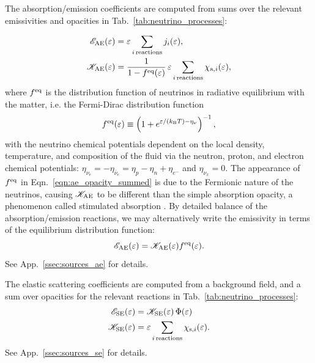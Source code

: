 \documentclass[aps,floatfix,prd,superscriptaddress,twocolumn]{revtex4-1}
\newcommand{\todo}[1]{\marginpar{\tiny{\textcolor{red}{#1}}}}
\renewcommand\todo[1]{} %
\begin{document}
The absorption/emission coefficients are computed from sums
over the relevant emissivities and opacities
in Tab.~\ref{tab:neutrino_processes}:
\todo{define $j$ and $\chi$}
\begin{align}
  \label{eqn:ae_emissivity_summed}
  \mathscr{E}_{\rm AE}(\varepsilon)
  &= \varepsilon \sum_{i\,{\rm reactions}} j_i(\varepsilon), \\
  \label{eqn:ae_opacity_summed}
  \mathscr{K}_{\rm AE}(\varepsilon)
  &= \frac{1}{1-f^{\rm eq}(\varepsilon)} \,
  \varepsilon \sum_{i\,{\rm reactions}} \chi_{{\rm a},i}(\varepsilon),
\end{align}
where $f^{\rm eq}$ is the distribution function of neutrinos in radiative
equilibrium with the matter, i.e. the Fermi-Dirac distribution function
\begin{equation}
  \label{eqn:feq}
  f^{\rm eq}(\varepsilon) \equiv
  \left(1+e^{\varepsilon/(k_{\rm B} T) -\eta_\nu}\right)^{-1},
\end{equation}
with the neutrino chemical potentials dependent on the local density,
temperature, and composition of the fluid via the neutron, proton,
and electron chemical potentials:
$\eta_{\nu_e}=-\eta_{\bar{\nu}_e}=\eta_p-\eta_n+\eta_{e^-}$ and
$\eta_{\nu_x}=0$.
The appearance of $f^{\rm eq}$ in Eqn.~\ref{eqn:ae_opacity_summed} is due to
the Fermionic nature of the neutrinos, causing $\mathscr{K}_{\rm AE}$ to be
different than the simple absorption opacity,
a phenomenon called stimulated absorption \cite{burr2006-neutrino_opacities}.
By detailed balance of the absorption/emission reactions, we may alternatively
write the emissivity in terms of the equilibrium distribution function:
\begin{equation}
  \label{eqn:ae_emissivity_feq}
  \mathscr{E}_{\rm AE}(\varepsilon)
  = \mathscr{K}_{\rm AE}(\varepsilon) f^{\rm eq}(\varepsilon).
\end{equation}
See App.~\ref{ssec:sources_ae} for details.
\todo{identify $\mathscr{K}_{\rm AE}$ and $\kappa^*$,
  in e.g.\ \cite{hari2010-gr_nunubar_collapsar}}

The elastic scattering coefficients are computed from
a background field, and a sum over opacities for
the relevant reactions in Tab.~\ref{tab:neutrino_processes}:
\begin{align}
  \label{eqn:se_emissivity}
  \mathscr{E}_{\rm SE}(\varepsilon)
  &= \mathscr{K}_{\rm SE}(\varepsilon) \, \Phi(\varepsilon) \, \\
  \label{eqn:se_opacity_summed}
  \mathscr{K}_{\rm SE}(\varepsilon)
  &= \varepsilon \sum_{i\,{\rm reactions}} \chi_{{\rm s},i}(\varepsilon).
\end{align}
See App.~\ref{ssec:sources_se} for details.
\end{document}

